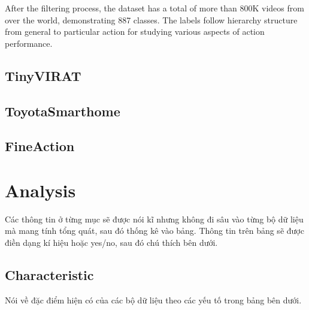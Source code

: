 \documentclass[a4paper]{article}
\begin{document}
After the filtering process, the dataset has a total of more than 800K videos from over the world, demonstrating 887 classes. The labels follow hierarchy structure from general to particular action for studying various aspects of action performance.
\subsection{TinyVIRAT}
\subsection{ToyotaSmarthome}
\subsection{FineAction}
\section{Analysis}
Các thông tin ở từng mục sẽ được nói kĩ nhưng không đi sâu vào từng bộ dữ liệu mà mang tính tổng quát, sau đó thống kê vào bảng. Thông tin trên bảng sẽ được điền dạng kí hiệu hoặc yes/no, sau đó chú thích bên dưới.

\subsection{Characteristic}
Nói về đặc điểm hiện có của các bộ dữ liệu theo các yếu tố trong bảng bên dưới.

\newcommand{\cmark}{\ding{51}}%
\newcommand{\xmark}{\ding{55}}%
\end{document}
